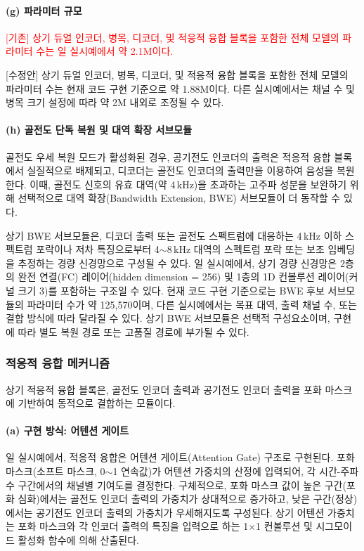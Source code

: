\documentclass{article}
\newcommand{\reviewold}[1]{{\par\noindent\textcolor{red}{[기존] #1}}}
\newcommand{\reviewnew}[1]{{\par\noindent\textcolor{customblue}{[수정안] #1}}}
\newcommand{\reviewpair}[2]{\reviewold{#1}\reviewnew{#2}\par}
\begin{document}
\paragraph{(g) 파라미터 규모}

\reviewpair{상기 듀얼 인코더, 병목, 디코더, 및 적응적 융합 블록을 포함한 전체 모델의 파라미터 수는 일 실시예에서 약 2.1M이다.}{상기 듀얼 인코더, 병목, 디코더, 및 적응적 융합 블록을 포함한 전체 모델의 파라미터 수는 현재 코드 구현 기준으로 약 1.88M이다. 다른 실시예에서는 채널 수 및 병목 크기 설정에 따라 약 2M 내외로 조정될 수 있다.}

\paragraph{(h) 골전도 단독 복원 및 대역 확장 서브모듈}

골전도 우세 복원 모드가 활성화된 경우, 공기전도 인코더의 출력은 적응적 융합 블록에서 실질적으로 배제되고, 디코더는 골전도 인코더의 출력만을 이용하여 음성을 복원한다. 이때, 골전도 신호의 유효 대역(약 4\,kHz)을 초과하는 고주파 성분을 보완하기 위해 선택적으로 대역 확장(Bandwidth Extension, BWE) 서브모듈이 더 동작할 수 있다.

상기 BWE 서브모듈은, 디코더 출력 또는 골전도 스펙트럼에 대응하는 4\,kHz 이하 스펙트럼 포락이나 저차 특징으로부터 4$\sim$8\,kHz 대역의 스펙트럼 포락 또는 보조 임베딩을 추정하는 경량 신경망으로 구성될 수 있다. 일 실시예에서, 상기 경량 신경망은 2층의 완전 연결(FC) 레이어(hidden dimension = 256) 및 1층의 1D 컨볼루션 레이어(커널 크기 3)를 포함하는 구조일 수 있다. 현재 코드 구현 기준으로는 BWE 후보 서브모듈의 파라미터 수가 약 125,570이며, 다른 실시예에서는 목표 대역, 출력 채널 수, 또는 결합 방식에 따라 달라질 수 있다. 상기 BWE 서브모듈은 선택적 구성요소이며, 구현에 따라 별도 복원 경로 또는 고품질 경로에 부가될 수 있다.

\subsubsection{적응적 융합 메커니즘}

상기 적응적 융합 블록은, 골전도 인코더 출력과 공기전도 인코더 출력을 포화 마스크에 기반하여 동적으로 결합하는 모듈이다.

\paragraph{(a) 구현 방식: 어텐션 게이트}

일 실시예에서, 적응적 융합은 어텐션 게이트(Attention Gate) 구조로 구현된다. 포화 마스크(소프트 마스크, 0$\sim$1 연속값)가 어텐션 가중치의 산정에 입력되어, 각 시간-주파수 구간에서의 채널별 기여도를 결정한다. 구체적으로, 포화 마스크 값이 높은 구간(포화 심화)에서는 골전도 인코더 출력의 가중치가 상대적으로 증가하고, 낮은 구간(정상)에서는 공기전도 인코더 출력의 가중치가 우세해지도록 구성된다. 상기 어텐션 가중치는 포화 마스크와 각 인코더 출력의 특징을 입력으로 하는 1$\times$1 컨볼루션 및 시그모이드 활성화 함수에 의해 산출된다.
\end{document}
